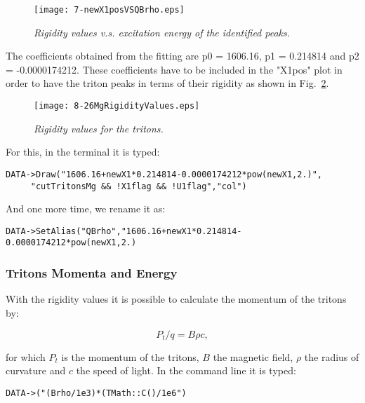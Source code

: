 \documentclass[11pt]{report}
\begin{document}
\begin{figure}[h]
 \begin{center}
\texttt{[image: 7-newX1posVSQBrho.eps]}  
 \end{center}
\vspace*{-4mm}
\caption{\label{fig:newX1posVSQBrho} \it Rigidity values v.s. excitation energy 
of the identified peaks\cite{nndc}.}
\end{figure}
\vspace*{4mm}

\noindent
The coefficients obtained from the fitting are p0 = 1606.16, 
p1 = 0.214814 and p2 = -0.0000174212. 
These coefficients have to be included in the "X1pos" plot in order to have
the triton peaks in terms of their rigidity as shown in Fig.~\ref{fig:26MgRigidityValues}.

\begin{figure}[h]
 \begin{center}
\texttt{[image: 8-26MgRigidityValues.eps]}  
 \end{center}
\vspace*{-4mm}
\caption{\label{fig:26MgRigidityValues} \it Rigidity values for the tritons.}
\end{figure}
\vspace*{4mm}

\noindent
For this, in the terminal it is typed:
\begin{verbatim}
DATA->Draw("1606.16+newX1*0.214814-0.0000174212*pow(newX1,2.)",
     "cutTritonsMg && !X1flag && !U1flag","col")
\end{verbatim}

\noindent
And one more time, we rename it as:
\begin{verbatim}
DATA->SetAlias("QBrho","1606.16+newX1*0.214814-0.0000174212*pow(newX1,2.)
\end{verbatim}


\subsubsection{Tritons Momenta and Energy}


With the rigidity values it is possible to calculate the momentum of the tritons by:

\begin{equation}
P_{t}/q=B\rho c,
\end{equation}

\noindent
for which $P_{t}$ is the momentum of the tritons, $B$ the magnetic field, 
$\rho$ the radius of curvature and $c$ the speed of light.
In the command line it is typed:
\begin{verbatim}
DATA->("(Brho/1e3)*(TMath::C()/1e6")
\end{verbatim}
\end{document}
